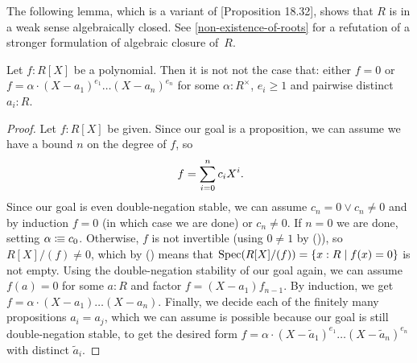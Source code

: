 The following lemma,
which is a variant of \cite{ingo-thesis}[Proposition 18.32],
shows that $R$ is in a weak sense algebraically closed.
See \cref{non-existence-of-roots} for a refutation of
a stronger formulation of algebraic closure of~$R$.

\begin{lemma}%
  \label{polynomials-notnot-decompose}
  Let $f : R[X]$ be a polynomial.
  Then it is not not the case that:
  either $f = 0$ or
  $f = \alpha \cdot {(X - a_1)}^{e_1} \dots {(X - a_n)}^{e_n}$
  for some $\alpha : R^\times$,
  $e_i \geq 1$ and pairwise distinct $a_i : R$.
\end{lemma}

\begin{proof}
  Let $f : R[X]$ be given.
  Since our goal is a proposition,
  we can assume we have a bound $n$ on the degree of $f$,
  so
  \[ f = \sum_{i = 0}^n c_i X^i \rlap{.} \]
  Since our goal is even double-negation stable,
  we can assume $c_n = 0 \lor c_n \neq 0$
  and by induction $f = 0$ (in which case we are done)
  or $c_n \neq 0$.
  If $n = 0$ we are done,
  setting $\alpha \vcentcolon\mspace{-1.2mu}\equiv c_0$.
  Otherwise,
  $f$ is not invertible (using $0 \neq 1$ by ()),
  so $R[X]/(f) \neq 0$,
  which by () means that
  $\operatorname{Spec}(R[X]/(f)) = \{ x : R \mid f(x) = 0 \}$
  is not empty.
  Using the double-negation stability of our goal again,
  we can assume $f(a) = 0$ for some $a : R$
  and factor $f = (X - a_1) f_{n - 1}$.
  By induction, we get $f = \alpha \cdot (X - a_1) \dots (X - a_n)$.
  Finally, we decide each of the finitely many propositions $a_i = a_j$,
  which we can assume is possible
  because our goal is still double-negation stable,
  to get the desired form
  $f = \alpha \cdot {(X - \widetilde{a}_1)}^{e_1} \dots {(X - \widetilde{a}_n)}^{e_n}$
  with distinct $\widetilde{a}_i$.
\end{proof}
